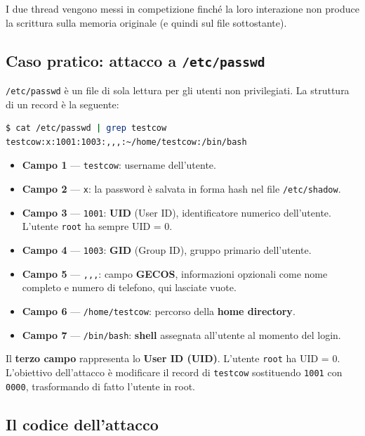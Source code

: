 \documentclass{article}
\begin{document}
I due thread vengono messi in competizione finché la loro interazione non produce la scrittura sulla memoria originale (e quindi sul file sottostante).

\subsection*{Caso pratico: attacco a \texttt{/etc/passwd}}

\texttt{/etc/passwd} è un file di sola lettura per gli utenti non privilegiati. La struttura di un record è la seguente:

\begin{lstlisting}[language=bash]
$ cat /etc/passwd | grep testcow
testcow:x:1001:1003:,,,:~/home/testcow:/bin/bash
\end{lstlisting}

\begin{itemize}
    \item \textbf{Campo 1} --- \texttt{testcow}: username dell'utente.
    \item \textbf{Campo 2} --- \texttt{x}: la password è salvata in forma hash nel file \texttt{/etc/shadow}.
    \item \textbf{Campo 3} --- \texttt{1001}: \textbf{UID} (User ID), identificatore numerico dell'utente. L'utente \texttt{root} ha sempre UID = 0.
    \item \textbf{Campo 4} --- \texttt{1003}: \textbf{GID} (Group ID), gruppo primario dell'utente.
    \item \textbf{Campo 5} --- \texttt{,,,}: campo \textbf{GECOS}, informazioni opzionali come nome completo e numero di telefono, qui lasciate vuote.
    \item \textbf{Campo 6} --- \texttt{/home/testcow}: percorso della \textbf{home directory}.
    \item \textbf{Campo 7} --- \texttt{/bin/bash}: \textbf{shell} assegnata all'utente al momento del login.
\end{itemize}

Il \textbf{terzo campo} rappresenta lo \textbf{User ID (UID)}. L'utente \texttt{root} ha UID = 0. L'obiettivo dell'attacco è modificare il record di \texttt{testcow} sostituendo \texttt{1001} con \texttt{0000}, trasformando di fatto l'utente in root.

\subsection*{Il codice dell'attacco}
\end{document}
